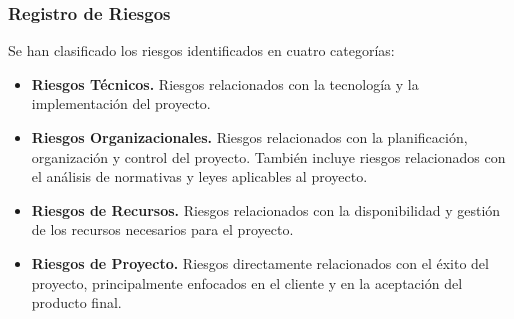 \subsubsection{Registro de Riesgos}
Se han clasificado los riesgos identificados en cuatro categorías:
\begin{itemize}
    \item \textbf{Riesgos Técnicos.} Riesgos relacionados con la tecnología y la implementación del proyecto.
    \item \textbf{Riesgos Organizacionales.} Riesgos relacionados con la planificación, organización y control del proyecto. También incluye riesgos relacionados con el análisis de normativas y leyes aplicables al proyecto.
    \item \textbf{Riesgos de Recursos.} Riesgos relacionados con la disponibilidad y gestión de los recursos necesarios para el proyecto.
    \item \textbf{Riesgos de Proyecto.} Riesgos directamente relacionados con el éxito del proyecto, principalmente enfocados en el cliente y en la aceptación del producto final.
\end{itemize}

